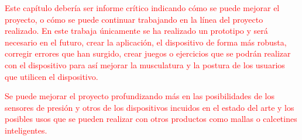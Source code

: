 


\textcolor{red}{Este capítulo debería ser informe crítico indicando cómo se puede mejorar el proyecto, o cómo se puede continuar trabajando en la línea del proyecto realizado.
En este trabaja únicamente se ha realizado un prototipo y será necesario en el futuro, crear la aplicación, el dispositivo de forma más robusta, corregir errores que han surgido, crear juegos o ejercicios que se podrán realizar con el dispositivo para así mejorar la musculatura y la postura de los usuarios que utilicen el dispositivo.}

\textcolor{red}{Se puede mejorar el proyecto profundizando más en las posibilidades de los sensores de presión y otros de los dispositivos incuidos en el estado del arte y los posibles usos que se pueden realizar con  otros productos como mallas o calcetines inteligentes.}
